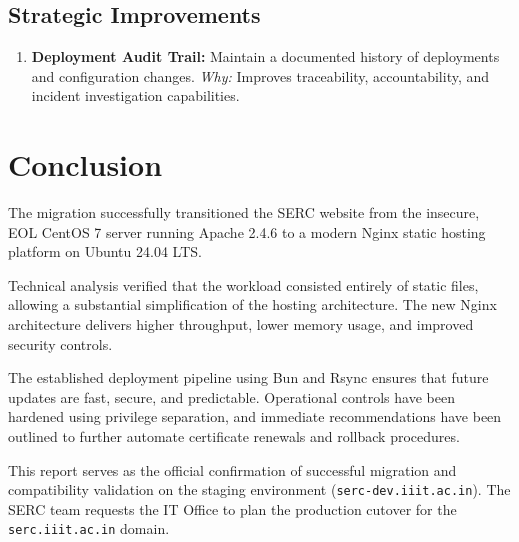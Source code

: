 \documentclass[11pt,a4paper,DIV=16,headings=normal,parskip=half]{scrartcl}
\begin{document}
\subsection{Strategic Improvements}

\begin{enumerate}
\item \textbf{Deployment Audit Trail:} Maintain a documented history of deployments and configuration changes.
\textit{Why:} Improves traceability, accountability, and incident investigation capabilities.
\end{enumerate}

\section{Conclusion}

The migration successfully transitioned the SERC website from the insecure, EOL CentOS 7 server running Apache 2.4.6 to a modern Nginx static hosting platform on Ubuntu 24.04 LTS.

Technical analysis verified that the workload consisted entirely of static files, allowing a substantial simplification of the hosting architecture. The new Nginx architecture delivers higher throughput, lower memory usage, and improved security controls.

The established deployment pipeline using Bun and Rsync ensures that future updates are fast, secure, and predictable. Operational controls have been hardened using privilege separation, and immediate recommendations have been outlined to further automate certificate renewals and rollback procedures.

This report serves as the official confirmation of successful migration and compatibility validation on the staging environment (\texttt{serc-dev.iiit.ac.in}). The SERC team requests the IT Office to plan the production cutover for the \texttt{serc.iiit.ac.in} domain.
\end{document}
